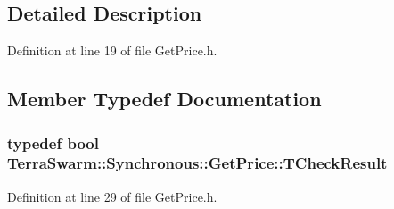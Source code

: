 \subsection{Detailed Description}


Definition at line 19 of file Get\-Price.\-h.



\subsection{Member Typedef Documentation}
\hypertarget{class_terra_swarm_1_1_synchronous_1_1_get_price_a174c0399b878132f69b36c99ec7a09b4}{
\subsubsection[{T\-Check\-Result}]{\setlength{\rightskip}{0pt plus 5cm}typedef bool {\bf Terra\-Swarm\-::\-Synchronous\-::\-Get\-Price\-::\-T\-Check\-Result}}}\label{class_terra_swarm_1_1_synchronous_1_1_get_price_a174c0399b878132f69b36c99ec7a09b4}


Definition at line 29 of file Get\-Price.\-h.



